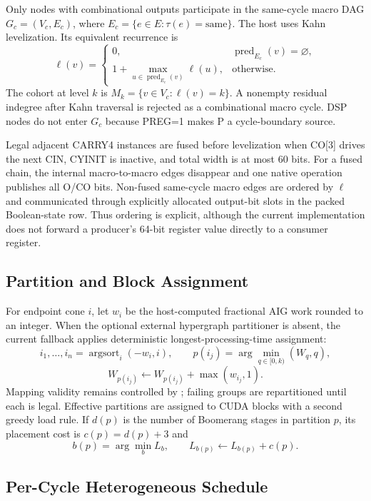 \documentclass[11pt,a4paper]{article}
\newcommand{\code}[1]{\texttt{\detokenize{#1}}}
\begin{document}
Only nodes with combinational outputs participate in the same-cycle macro DAG
$G_c=(V_c,E_c)$, where $E_c=\{e\in E:\tau(e)=\mathrm{same}\}$.  The host uses
Kahn levelization.  Its equivalent recurrence is
\[
 \ell(v)=
 \begin{cases}
  0, & \operatorname{pred}_{E_c}(v)=\varnothing,\\
  1+\max\limits_{u\in\operatorname{pred}_{E_c}(v)}\ell(u),&\text{otherwise}.
 \end{cases}
\]
The cohort at level $k$ is $M_k=\{v\in V_c:\ell(v)=k\}$.  A nonempty residual
indegree after Kahn traversal is rejected as a combinational macro cycle.
DSP nodes do not enter $G_c$ because PREG=1 makes P a cycle-boundary source.

Legal adjacent CARRY4 instances are fused before levelization when
CO[3] drives the next CIN, CYINIT is inactive, and total width is at most 60
bits.  For a fused chain, the internal macro-to-macro edges disappear and one
native operation publishes all O/CO bits.  Non-fused same-cycle macro edges are
ordered by $\ell$ and communicated through explicitly allocated output-bit
slots in the packed Boolean-state row.  Thus ordering is explicit, although the
current implementation does not forward a producer's 64-bit register value
directly to a consumer register.

\subsection{Partition and Block Assignment}

For endpoint cone $i$, let $w_i$ be the host-computed fractional AIG work rounded
to an integer.  When the optional external hypergraph partitioner is absent, the
current fallback applies deterministic longest-processing-time assignment:
\[
  i_1,\ldots,i_n=\operatorname{argsort}_{i}(-w_i,i),\qquad
  p(i_j)=\arg\min_{q\in[0,k)}\left(W_q,q\right),
\]
\[
  W_{p(i_j)}\leftarrow W_{p(i_j)}+\max(w_{i_j},1).
\]
Mapping validity remains controlled by \code{Partition::build\_one}; failing
groups are repartitioned until each is legal.  Effective partitions are assigned
to CUDA blocks with a second greedy load rule.  If $d(p)$ is the number of
Boomerang stages in partition $p$, its placement cost is $c(p)=d(p)+3$ and
\[
 b(p)=\arg\min_b L_b,\qquad L_{b(p)}\leftarrow L_{b(p)}+c(p).
\]

\subsection{Per-Cycle Heterogeneous Schedule}
\end{document}
